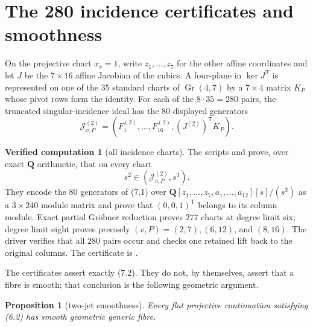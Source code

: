 \documentclass[11pt]{article}
\newtheorem{proposition}[theorem]{Proposition}
\theoremstyle{definition}
\newtheorem{computation}[theorem]{Verified computation}
\theoremstyle{remark}
\newcommand{\QQ}{\mathbf Q}
\begin{document}
\section{The 280 incidence certificates and smoothness}

On the projective chart $x_v=1$, write $z_1,\ldots,z_7$ for the other affine
coordinates and let $J$ be the $7\times16$ affine Jacobian of the cubics.  A
four-plane in $\ker J^{\mathsf T}$ is represented on one of the $35$
standard charts of $\operatorname{Gr}(4,7)$ by a $7\times4$ matrix $K_P$
whose pivot rows form the identity.  For each of the $8\cdot35=280$ pairs,
the truncated singular-incidence ideal has the $80$ displayed generators
\[
 \mathcal J_{v,P}^{(2)}
 =(F_1^{(2)},\ldots,F_{16}^{(2)},(J^{(2)})^{\mathsf T}K_P).
\tag{7.1}
\]

\begin{computation}[all incidence charts]\label{comp:incidence}
The scripts  and
 prove, over exact
$\QQ$ arithmetic, that on every chart
\[
 s^2\in(\mathcal J_{v,P}^{(2)},s^3).                          \tag{7.2}
\]
They encode the $80$ generators of (7.1) over
$\QQ[z_1,\ldots,z_7,a_1,\ldots,a_{12}][s]/(s^3)$ as a
$3\times240$ module matrix and prove that $(0,0,1)^{\mathsf T}$ belongs to
its column module.  Exact partial Gr\"obner reduction proves $277$ charts at
degree limit six; degree limit eight proves precisely $(v,P)=(2,7),(6,12)$,
and $(8,16)$.  The driver verifies that all $280$ pairs occur and checks one
retained lift back to the original columns.  The certificate is
.
\end{computation}

The certificates assert exactly (7.2).  They do not, by themselves, assert
that a fibre is smooth; that conclusion is the following geometric argument.

\begin{proposition}[two-jet smoothness]\label{prop:smooth}
Every flat projective continuation satisfying (6.2) has smooth geometric
generic fibre.
\end{proposition}
\end{document}
